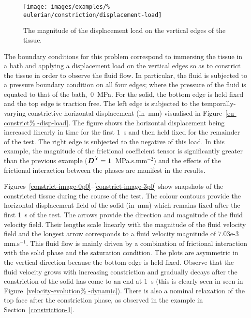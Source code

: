 \begin{figure}[!hptb]
\centering
{}
\texttt{[image: images/examples/\%
  eulerian/constriction/displacement-load]}
\caption{The magnitude of the displacement load on the vertical edges
  of the tissue.}
\label{eu-constrict-disp-load}
\end{figure}

The boundary conditions for this problem correspond to immersing the
tissue in a bath and applying a displacement load on the vertical
edges so as to constrict the tissue in order to observe the fluid
flow. In particular, the fluid is subjected to a pressure boundary
condition on all four edges; where the pressure of the fluid is
equated to that of the bath,~0~MPa. For the solid, the bottom edge is
held fixed and the top edge is traction free. The left edge is
subjected to the temporally-varying constrictive horizontal
displacement (in~mm) visualised in Figure~\ref{eu-constrict%
  -disp-load}. The figure shows the horizontal displacement being
increased linearly in time for the first 1~s and then held fixed for
the remainder of the test. The right edge is subjected to the negative
of this load. In this example, the magnitude of the frictional
coefficient tensor is significantly greater than the previous example
($\mbox{\boldmath$ D$}^{\mathrm{fc}} = {\bf 1}$~MPa.s.mm$^{-2}$) and the effects of the
frictional interaction between the phases are manifest in the results.

Figures~\ref{constrict-image-0p0}--\ref{constrict-image-3p0} show
snapshots of the constricted tissue during the course of the test. The
colour contours provide the horizontal displacement field of the solid
(in~mm) which remains fixed after the first 1~s of the test. The
arrows provide the direction and magnitude of the fluid velocity
field. Their lengths scale linearly with the magnitude of the fluid
velocity field and the longest arrow corresponds to a fluid velocity
magnitude of 7.03e-3 mm.s$^{-1}$. This fluid flow is mainly driven by
a combination of frictional interaction with the solid phase and the
saturation condition. The plots are asymmetric in the vertical
direction because the bottom edge is held fixed. Observe that the
fluid velocity grows with increasing constriction and gradually decays
after the constriction of the solid has come to an end at 1~s (this is
clearly seen in seen in Figure~\ref{velocity-evolution%
  -dynamic}). There is also a nominal relaxation of the top face after
the constriction phase, as observed in the example in
Section~\ref{constriction-1}.

